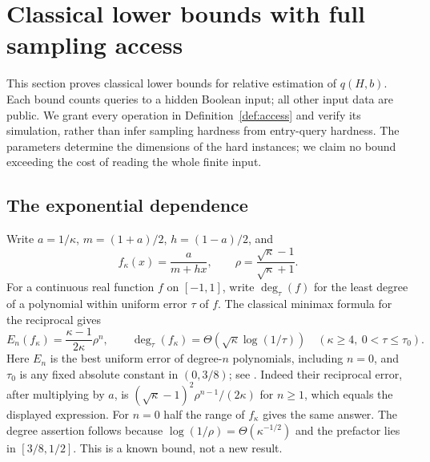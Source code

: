 \section{Classical lower bounds with full sampling access}\label{sec:lower}
This section proves classical lower bounds for relative estimation of
$q(H,b)$. Each bound counts queries to a hidden Boolean input; all other
input data are public. We grant every operation in
Definition~\ref{def:access} and verify its simulation, rather than infer
sampling hardness from entry-query hardness. The parameters determine the
dimensions of the hard instances; we claim no bound exceeding the cost of
reading the whole finite input.

\subsection{The exponential dependence}
Write $a=1/\kappa$, $m=(1+a)/2$, $h=(1-a)/2$, and
\begin{equation}\label{eq:normalized-reciprocal}
 f_\kappa(x)=\frac{a}{m+hx},\qquad
 \rho=\frac{\sqrt\kappa-1}{\sqrt\kappa+1}.
\end{equation}
For a continuous real function $f$ on $[-1,1]$, write
$\deg_\tau(f)$ for the least degree of a polynomial within uniform
error $\tau$ of $f$.
The classical minimax formula for the reciprocal gives
\begin{equation}\label{eq:reciprocal-degree}
 E_n(f_\kappa)=\frac{\kappa-1}{2\kappa}\rho^n,
 \qquad
 \deg_\tau(f_\kappa)=\Theta(\sqrt\kappa\log(1/\tau))
 \quad(\kappa\geq4,\ 0<\tau\leq\tau_0).
\end{equation}
Here $E_n$ is the best uniform error of degree-$n$ polynomials,
including $n=0$, and $\tau_0$ is any fixed absolute constant in $(0,3/8)$; see
\citet[Corollary 2.2]{KrausVassilevskiZikatanov2012}.
Indeed their reciprocal error, after multiplying by $a$, is
$(\sqrt\kappa-1)^2\rho^{n-1}/(2\kappa)$ for $n\geq1$,
which equals the displayed expression. For $n=0$ half the range of
$f_\kappa$ gives the same answer. The degree assertion follows because
$\log(1/\rho)=\Theta(\kappa^{-1/2})$ and the prefactor lies in $[3/8,1/2]$.
This is a known bound, not a new result.

